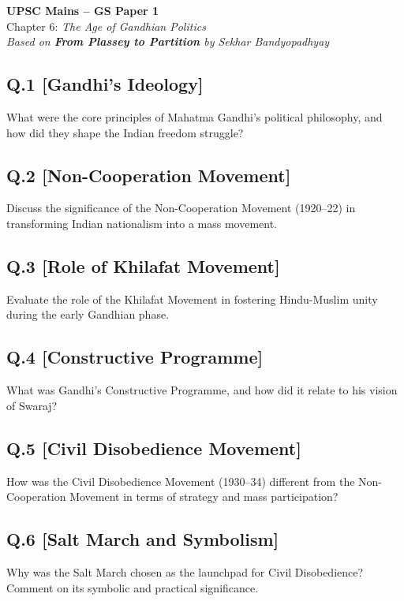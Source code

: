 \begin{center}
    \Large\textbf{UPSC Mains – GS Paper 1}\\
    \normalsize Chapter 6: \textit{The Age of Gandhian Politics}\\
    \vspace{0.5em}
    \textit{Based on \textbf{From Plassey to Partition} by Sekhar Bandyopadhyay}
\end{center}

\vspace{1em}

\subsection*{Q.1 [Gandhi’s Ideology]}
What were the core principles of Mahatma Gandhi's political philosophy, and how did they shape the Indian freedom struggle?

\subsection*{Q.2 [Non-Cooperation Movement]}
Discuss the significance of the Non-Cooperation Movement (1920–22) in transforming Indian nationalism into a mass movement.

\subsection*{Q.3 [Role of Khilafat Movement]}
Evaluate the role of the Khilafat Movement in fostering Hindu-Muslim unity during the early Gandhian phase.

\subsection*{Q.4 [Constructive Programme]}
What was Gandhi’s Constructive Programme, and how did it relate to his vision of Swaraj?

\subsection*{Q.5 [Civil Disobedience Movement]}
How was the Civil Disobedience Movement (1930–34) different from the Non-Cooperation Movement in terms of strategy and mass participation?

\subsection*{Q.6 [Salt March and Symbolism]}
Why was the Salt March chosen as the launchpad for Civil Disobedience? Comment on its symbolic and practical significance.

